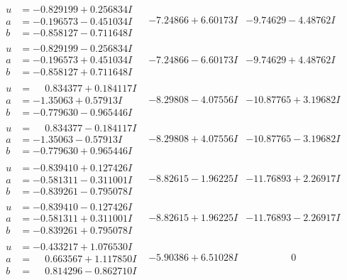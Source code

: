 \documentclass[1p]{elsarticle_modified}
\theoremstyle{definition}
\begin{document}
$$\begin{array}{c|c|c}
\begin{aligned}
u &= -0.829199 + 0.256834 I \\
a &= -0.196573 - 0.451034 I \\
b &= -0.858127 - 0.711648 I\end{aligned}
 & -7.24866 + 6.60173 I & -9.74629 - 4.48762 I \\ \hline\begin{aligned}
u &= -0.829199 - 0.256834 I \\
a &= -0.196573 + 0.451034 I \\
b &= -0.858127 + 0.711648 I\end{aligned}
 & -7.24866 - 6.60173 I & -9.74629 + 4.48762 I \\ \hline\begin{aligned}
u &= \phantom{-}0.834377 + 0.184117 I \\
a &= -1.35063 + 0.57913 I \\
b &= -0.779630 - 0.965446 I\end{aligned}
 & -8.29808 - 4.07556 I & -10.87765 + 3.19682 I \\ \hline\begin{aligned}
u &= \phantom{-}0.834377 - 0.184117 I \\
a &= -1.35063 - 0.57913 I \\
b &= -0.779630 + 0.965446 I\end{aligned}
 & -8.29808 + 4.07556 I & -10.87765 - 3.19682 I \\ \hline\begin{aligned}
u &= -0.839410 + 0.127426 I \\
a &= -0.581311 - 0.311001 I \\
b &= -0.839261 - 0.795078 I\end{aligned}
 & -8.82615 - 1.96225 I & -11.76893 + 2.26917 I \\ \hline\begin{aligned}
u &= -0.839410 - 0.127426 I \\
a &= -0.581311 + 0.311001 I \\
b &= -0.839261 + 0.795078 I\end{aligned}
 & -8.82615 + 1.96225 I & -11.76893 - 2.26917 I \\ \hline\begin{aligned}
u &= -0.433217 + 1.076530 I \\
a &= \phantom{-}0.663567 + 1.117850 I \\
b &= \phantom{-}0.814296 - 0.862710 I\end{aligned}
 & -5.90386 + 6.51028 I & \phantom{-0.000000 } 0 \\ \hline\begin{aligned}

\end{aligned}
\end{array}$$
\end{document}
